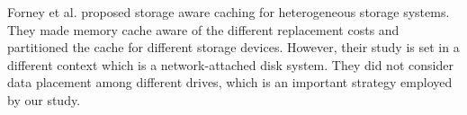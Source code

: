 Forney et al. \cite{Forney2002fast} proposed storage aware caching for
heterogeneous storage systems. They made memory cache aware of the different
replacement costs and partitioned the cache for different storage devices.
However, their study is set in a different context which is a network-attached
disk system.  They did not consider data placement among different drives,
     which is an important strategy employed by our study.

